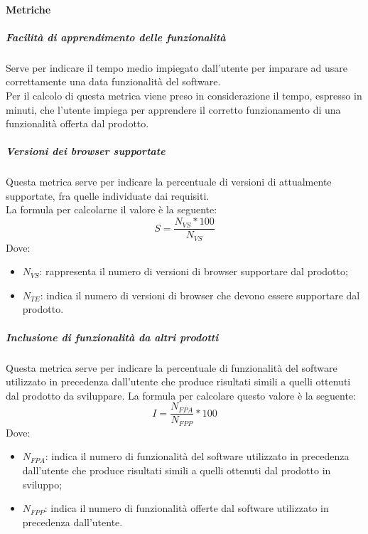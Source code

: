 \documentclass[../NormeDiProgetto_v4.0.0.tex]{subfiles}
\begin{document}
		\paragraph{Metriche}
            
			\subparagraph{Facilità di apprendimento delle funzionalità}
				Serve per indicare il tempo medio impiegato dall'utente per imparare ad usare correttamente una data funzionalità del software.\\
				Per il calcolo di questa metrica viene preso in considerazione il tempo, espresso in minuti, che l'utente impiega per apprendere il corretto funzionamento di una funzionalità offerta dal prodotto.

			\subparagraph{Versioni dei browser supportate}
				Questa metrica serve per indicare la percentuale di versioni di  attualmente supportate, fra quelle individuate dai requisiti. \\La formula per calcolarne il valore è la seguente:
					\begin{equation*}
						S = \frac{N_{VS} * 100}{N_{VS}}
					\end{equation*}
					Dove:
					\begin{itemize}
						\item \textbf{$N_{VS}$}: rappresenta il numero di versioni di browser supportare dal prodotto;
						\item \textbf{$N_{TE}$}: indica il numero di versioni di browser che devono essere supportare dal prodotto.
					\end{itemize}
					
			\subparagraph{Inclusione di funzionalità da altri prodotti}
				Questa metrica serve per indicare la percentuale di funzionalità del software utilizzato in precedenza dall'utente che produce risultati simili a quelli ottenuti dal prodotto da sviluppare. La formula per calcolare questo valore è la seguente:
					\begin{equation*}
						I = \frac{N_{FPA}}{N_{FPP}} * 100
					\end{equation*}
					Dove:
					\begin{itemize}
						\item \textbf{$N_{FPA}$}: indica il numero di funzionalità del software utilizzato in precedenza dall'utente che produce risultati simili a quelli ottenuti dal prodotto in sviluppo;
						\item \textbf{$N_{FPP}$}: indica il numero di funzionalità offerte dal software utilizzato in precedenza dall'utente.
					\end{itemize}
		
\end{document}
